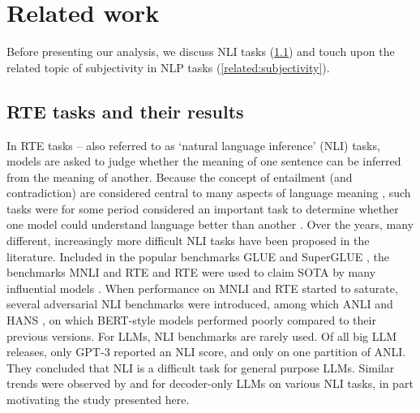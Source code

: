 \section{Related work}

Before presenting our analysis, we %
discuss NLI tasks (\cref{related:nli}) and touch upon the related topic of subjectivity in NLP tasks (\cref{related:subjectivity}).

\subsection{RTE tasks and their results}
\label{related:nli}

In RTE tasks -- also referred to as `natural language inference' (NLI) tasks, models are asked to judge whether the meaning of one sentence can be inferred from the meaning of another.
Because the concept of entailment (and contradiction) are considered central to many aspects of language meaning \citep[e.g.][]{bowman-etal-2015-large}, such tasks were for some period considered an important task to determine whether one model could understand language better than another \citep{poliak-2020-survey}.
Over the years, many different, increasingly more difficult NLI tasks have been proposed in the literature.
Included in the popular benchmarks GLUE \citep{wang2019glue} and SuperGLUE \citep{wang2019superglue}, the benchmarks MNLI \citep{williams-etal-2018-broad} and RTE \citep{dagan2005pascal} and RTE were used to claim SOTA by many influential models \citep[e.g.][]{raffel2023t5,devlin2019BERT}.
When performance on MNLI and RTE started to saturate, several adversarial NLI benchmarks were introduced, among which ANLI \citep{raffel2023t5} and HANS \citep{mccoy-etal-2019-right}, on which BERT-style models performed poorly compared to their previous versions.
For LLMs, NLI benchmarks are rarely used.
Of all big LLM releases, only GPT-3 \citep{brown2020language} reported an NLI score, and only on one partition of ANLI.
They concluded that NLI is a difficult task for general purpose LLMs.
Similar trends were observed by \citet{ohmer2024form} and \citet{weber-etal-2023-mind} for decoder-only LLMs on various NLI tasks, in part motivating the study presented here.
